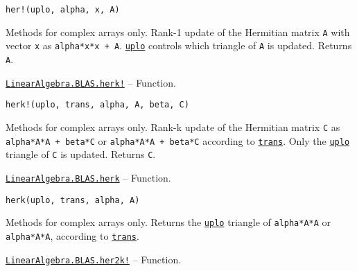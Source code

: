 \begin{adjustwidth}{2em}{0pt}


\begin{verbatim}
her!(uplo, alpha, x, A)
\end{verbatim}

Methods for complex arrays only. Rank-1 update of the Hermitian matrix \texttt{A} with vector \texttt{x} as \texttt{alpha*x*x{\textquotesingle} + A}. \hyperlink{13880289478825450693}{\texttt{uplo}} controls which triangle of \texttt{A} is updated. Returns \texttt{A}.



\end{adjustwidth}
\hypertarget{13961548415194246627}{}
\hyperlink{13961548415194246627}{\texttt{LinearAlgebra.BLAS.herk!}}  -- {Function.}

\begin{adjustwidth}{2em}{0pt}


\begin{verbatim}
herk!(uplo, trans, alpha, A, beta, C)
\end{verbatim}

Methods for complex arrays only. Rank-k update of the Hermitian matrix \texttt{C} as \texttt{alpha*A*A{\textquotesingle} + beta*C} or \texttt{alpha*A{\textquotesingle}*A + beta*C} according to \hyperlink{15951037910221396131}{\texttt{trans}}. Only the \hyperlink{13880289478825450693}{\texttt{uplo}} triangle of \texttt{C} is updated. Returns \texttt{C}.



\end{adjustwidth}
\hypertarget{10248669546555807730}{}
\hyperlink{10248669546555807730}{\texttt{LinearAlgebra.BLAS.herk}}  -- {Function.}

\begin{adjustwidth}{2em}{0pt}


\begin{verbatim}
herk(uplo, trans, alpha, A)
\end{verbatim}

Methods for complex arrays only. Returns the \hyperlink{13880289478825450693}{\texttt{uplo}} triangle of \texttt{alpha*A*A{\textquotesingle}} or \texttt{alpha*A{\textquotesingle}*A}, according to \hyperlink{15951037910221396131}{\texttt{trans}}.



\end{adjustwidth}
\hypertarget{7429214484576657213}{}
\hyperlink{7429214484576657213}{\texttt{LinearAlgebra.BLAS.her2k!}}  -- {Function.}

